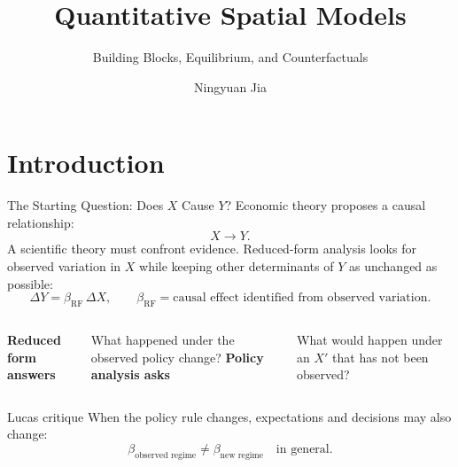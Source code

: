 \documentclass[aspectratio=169,11pt]{beamer}
\title{Quantitative Spatial Models}
\subtitle{Building Blocks, Equilibrium, and Counterfactuals}
\author{Ningyuan Jia}
\institute{University of International Business and Economics}
\date{}
\newcommand{\B}[1]{\textcolor{blue1}{\textbf{#1}}}
\begin{document}
\begin{frame}[plain]
  \titlepage
\end{frame}

\section{Introduction}

\begin{frame}{The Starting Question: Does \(X\) Cause \(Y\)?}
  Economic theory proposes a causal relationship:
  \[
    X\longrightarrow Y.
  \]
  A scientific theory must confront evidence. Reduced-form analysis looks for
  observed variation in \(X\) while keeping other determinants of \(Y\) as
  unchanged as possible:
  \[
    \Delta Y=\beta_{\mathrm{RF}}\,\Delta X,
    \qquad
    \beta_{\mathrm{RF}}
    =
    \text{causal effect identified from observed variation}.
  \]

  \begin{columns}[T,onlytextwidth]\small
      \B{Reduced form answers}

      What happened under the observed policy change?
      \B{Policy analysis asks}

      What would happen under an \(X'\) that has not been observed?
  \end{columns}

  \vfill
  \begin{alertblock}{Lucas critique}
    \small
    When the policy rule changes, expectations and decisions may also change:
    \[
      \beta_{\text{observed regime}}
      \neq
      \beta_{\text{new regime}}
      \quad\text{in general}.
    \]
  \end{alertblock}
\end{frame}
\end{document}
